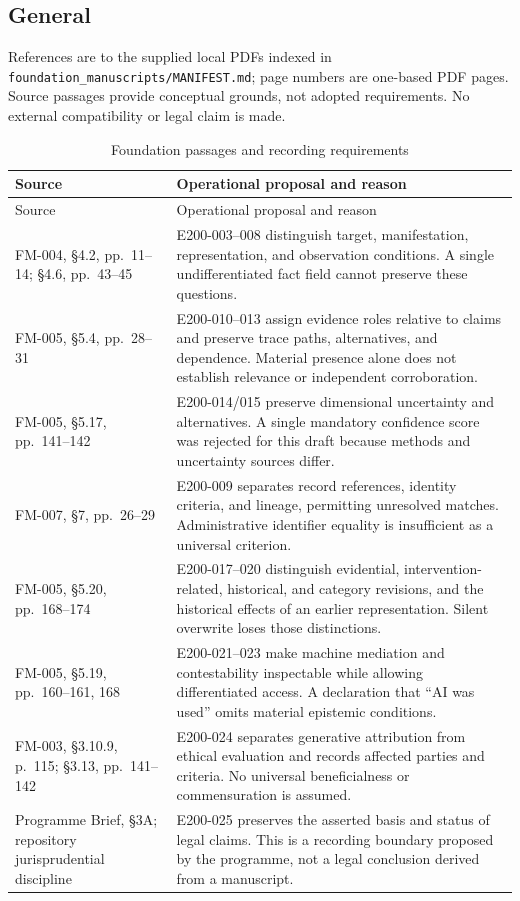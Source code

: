 \documentclass[11pt,a4paper]{article}
\begin{document}
\subsection{General}

References are to the supplied local PDFs indexed in \texttt{foundation\_manuscripts/MANIFEST.md}; page numbers are one-based PDF pages. Source passages provide conceptual grounds, not adopted requirements. No external compatibility or legal claim is made.

\begin{longtable}{@{}L{0.29\textwidth}L{0.61\textwidth}@{}}
\caption{Foundation passages and recording requirements}\label{tab:gr200-sources}\\
\toprule
Source & Operational proposal and reason \\
\midrule\endfirsthead
\toprule
Source & Operational proposal and reason \\
\midrule\endhead
FM-004, \S4.2, pp.~11--14; \S4.6, pp.~43--45 & E200-003--008 distinguish target, manifestation, representation, and observation conditions. A single undifferentiated fact field cannot preserve these questions. \\
FM-005, \S5.4, pp.~28--31 & E200-010--013 assign evidence roles relative to claims and preserve trace paths, alternatives, and dependence. Material presence alone does not establish relevance or independent corroboration. \\
FM-005, \S5.17, pp.~141--142 & E200-014/015 preserve dimensional uncertainty and alternatives. A single mandatory confidence score was rejected for this draft because methods and uncertainty sources differ. \\
FM-007, \S7, pp.~26--29 & E200-009 separates record references, identity criteria, and lineage, permitting unresolved matches. Administrative identifier equality is insufficient as a universal criterion. \\
FM-005, \S5.20, pp.~168--174 & E200-017--020 distinguish evidential, intervention-related, historical, and category revisions, and the historical effects of an earlier representation. Silent overwrite loses those distinctions. \\
FM-005, \S5.19, pp.~160--161, 168 & E200-021--023 make machine mediation and contestability inspectable while allowing differentiated access. A declaration that ``AI was used'' omits material epistemic conditions. \\
FM-003, \S3.10.9, p.~115; \S3.13, pp.~141--142 & E200-024 separates generative attribution from ethical evaluation and records affected parties and criteria. No universal beneficialness or commensuration is assumed. \\
Programme Brief, \S3A; repository jurisprudential discipline & E200-025 preserves the asserted basis and status of legal claims. This is a recording boundary proposed by the programme, not a legal conclusion derived from a manuscript. \\
\bottomrule
\end{longtable}
\end{document}
